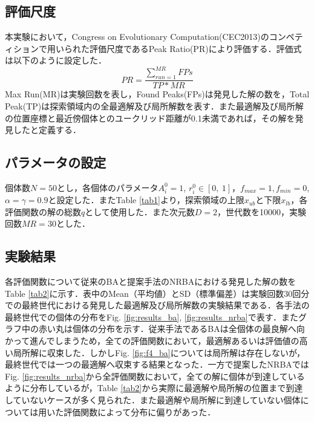 \documentclass{jarticle}
\begin{document}
\subsection{評価尺度}
本実験において，Congress on Evolutionary Computation(CEC2013)\cite{cec2013}のコンペティションで用いられた評価尺度であるPeak Ratio(PR)\cite{crowdingDE}により評価する．評価式は以下のように設定した．
\begin{equation}
\label{eq:PR}
PR=\frac{\sum_{run=1}^{MR}FPs}{TP*MR}
\end{equation}
Max Run(MR)は実験回数を表し，Found Peaks(FPs)は発見した解の数を，Total Peak(TP)は探索領域内の全最適解及び局所解数を表す．また最適解及び局所解の位置座標と最近傍個体とのユークリッド距離が0.1未満であれば，その解を発見したと定義する．

\subsection{パラメータの設定}
個体数$N=50$とし，各個体のパラメータ$A_i^0=1$, $r_i^0 \in [0,\ 1]$，$f_{max}=1, f_{min}=0$, $\alpha = \gamma = 0.9$と設定した．またTable \ref{tab1}より，探索領域の上限$x_{ub}$と下限$x_{lb}$，各評価関数の解の総数$q$として使用した．また次元数$D=2$，世代数を10000，実験回数$MR=30$とした．

\subsection{実験結果}
各評価関数について従来のBAと提案手法のNRBAにおける発見した解の数をTable \ref{tab2}に示す．表中のMean（平均値）とSD（標準偏差）は実験回数30回分での最終世代における発見した最適解及び局所解数の実験結果である．各手法の最終世代での個体の分布をFig. \ref{fig:results_ba}, \ref{fig:results_nrba}で表す．またグラフ中の赤い丸は個体の分布を示す．従来手法であるBAは全個体の最良解へ向かって進んでしまうため，全ての評価関数において，最適解あるいは評価値の高い局所解に収束した．しかしFig. \ref{fig:f4_ba}については局所解は存在しないが，最終世代では一つの最適解へ収束する結果となった．一方で提案したNRBAではFig. \ref{fig:results_nrba}から全評価関数において，全ての解に個体が到達しているように分布しているが，Table \ref{tab2}から実際に最適解や局所解の位置まで到達していないケースが多く見られた．また最適解や局所解に到達していない個体については用いた評価関数によって分布に偏りがあった．
\end{document}
